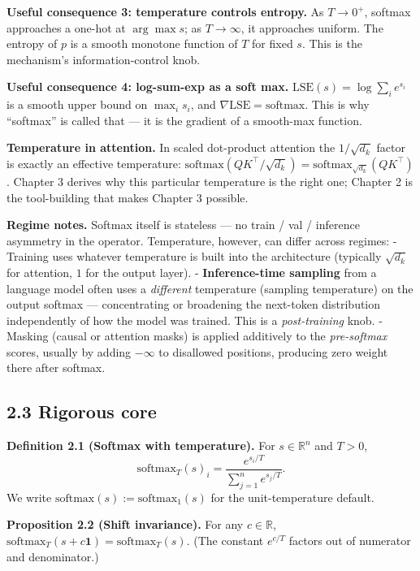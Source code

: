 \documentclass[
]{article}
\begin{document}
\textbf{Useful consequence 3: temperature controls entropy.} As
\(T \to 0^+\), softmax approaches a one-hot at \(\arg\max s\); as
\(T \to \infty\), it approaches uniform. The entropy of \(p\) is a
smooth monotone function of \(T\) for fixed \(s\). This is the
mechanism's information-control knob.

\textbf{Useful consequence 4: log-sum-exp as a soft max.}
\(\text{LSE}(s) = \log \sum_i e^{s_i}\) is a smooth upper bound on
\(\max_i s_i\), and \(\nabla \text{LSE} = \text{softmax}\). This is why
``softmax'' is called that --- it is the gradient of a smooth-max
function.

\textbf{Temperature in attention.} In scaled dot-product attention the
\(1/\sqrt{d_k}\) factor is exactly an effective temperature:
\(\text{softmax}(QK^\top / \sqrt{d_k}) = \text{softmax}_{\sqrt{d_k}}(QK^\top)\).
Chapter 3 derives why this particular temperature is the right one;
Chapter 2 is the tool-building that makes Chapter 3 possible.

\textbf{Regime notes.} Softmax itself is stateless --- no train / val /
inference asymmetry in the operator. Temperature, however, can differ
across regimes: - Training uses whatever temperature is built into the
architecture (typically \(\sqrt{d_k}\) for attention, \(1\) for the
output layer). - \textbf{Inference-time sampling} from a language model
often uses a \emph{different} temperature (sampling temperature) on the
output softmax --- concentrating or broadening the next-token
distribution independently of how the model was trained. This is a
\emph{post-training} knob. - Masking (causal or attention masks) is
applied additively to the \emph{pre-softmax} scores, usually by adding
\(-\infty\) to disallowed positions, producing zero weight there after
softmax.

\hypertarget{rigorous-core}{%
\subsection{2.3 Rigorous core}\label{rigorous-core}}

\textbf{Definition 2.1 (Softmax with temperature).} For
\(s \in \mathbb{R}^n\) and \(T > 0\),
\[\text{softmax}_T(s)_i = \frac{e^{s_i / T}}{\sum_{j=1}^n e^{s_j / T}}.\]
We write \(\text{softmax}(s) := \text{softmax}_1(s)\) for the
unit-temperature default.

\textbf{Proposition 2.2 (Shift invariance).} For any
\(c \in \mathbb{R}\),
\(\text{softmax}_T(s + c \mathbf{1}) = \text{softmax}_T(s)\). (The
constant \(e^{c/T}\) factors out of numerator and denominator.)
\end{document}

